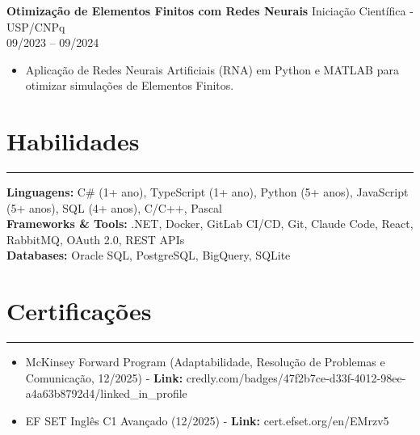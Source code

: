 \documentclass[10pt,a4paper]{article}
\begin{document}
\textbf{Otimização de Elementos Finitos com Redes Neurais} \hfill Iniciação Científica - USP/CNPq \\
\textit{} \hfill 09/2023 -- 09/2024
\begin{itemize}[nosep]
    \item Aplicação de Redes Neurais Artificiais (RNA) em Python e MATLAB para otimizar simulações de Elementos Finitos.
\end{itemize}

\section*{Habilidades}
\hrule \vspace{2mm}
\textbf{Linguagens:} C\# (1+ ano), TypeScript (1+ ano), Python (5+ anos), JavaScript (5+ anos), SQL (4+ anos), C/C++, Pascal \\
\textbf{Frameworks \& Tools:} .NET, Docker, GitLab CI/CD, Git, Claude Code, React, RabbitMQ, OAuth 2.0, REST APIs \\
\textbf{Databases:} Oracle SQL, PostgreSQL, BigQuery, SQLite

\section*{Certificações}
\hrule \vspace{2mm}
\begin{itemize}[nosep]
    \item McKinsey Forward Program (Adaptabilidade, Resolução de Problemas e Comunicação, 12/2025) - \textbf{Link:} credly.com/badges/47f2b7ce-d33f-4012-98ee-a4a63b8792d4/linked\_in\_profile
    \item EF SET Inglês C1 Avançado (12/2025) - \textbf{Link:} cert.efset.org/en/EMrzv5
\end{itemize}
\end{document}
